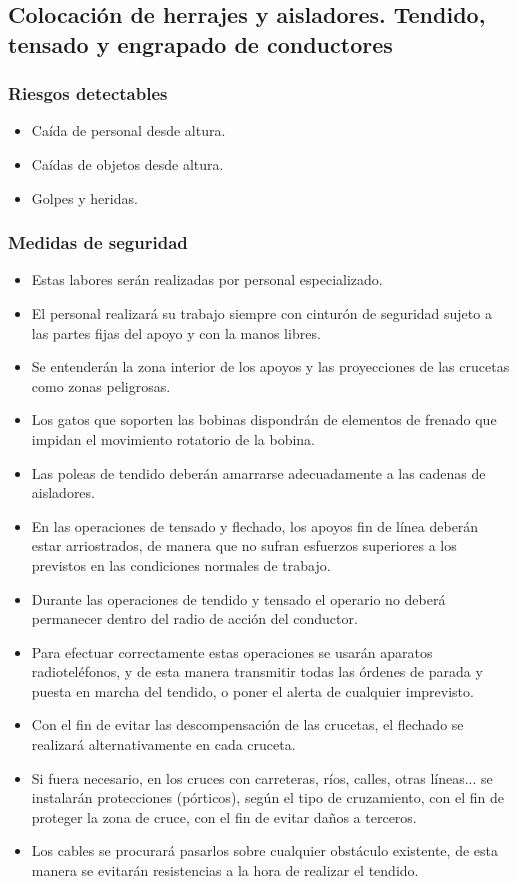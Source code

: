 \subsection{Colocación de herrajes y aisladores. Tendido, tensado y engrapado de conductores}
\label{subsec:sys-riesgosHerrajes}
\subsubsection{Riesgos detectables}
\label{subsubsec:sysHerrajes-RD}
\begin{itemize}
    \item Caída de personal desde altura.
    \item Caídas de objetos desde altura.
    \item Golpes y heridas.
\end{itemize}
\subsubsection{Medidas de seguridad}
\label{subsubsec:sysHerrajes-MS}
\begin{itemize}
    \item Estas labores serán realizadas por personal especializado.
    \item El personal realizará su trabajo siempre con cinturón de seguridad sujeto a las partes fijas del apoyo y con la manos libres.
    \item Se entenderán la zona interior de los apoyos y las proyecciones de las crucetas como zonas peligrosas.
    \item Los gatos que soporten las bobinas dispondrán de elementos de frenado que impidan el movimiento rotatorio de la bobina.
    \item Las poleas de tendido deberán amarrarse adecuadamente a las cadenas de aisladores.
    \item En las operaciones de tensado y flechado, los apoyos fin de línea deberán estar arriostrados, de manera que no sufran esfuerzos superiores a los previstos en las condiciones normales de trabajo.
    \item Durante las operaciones de tendido y tensado el operario no deberá permanecer dentro del radio de acción del conductor.
    \item Para efectuar correctamente estas operaciones se usarán aparatos radioteléfonos, y de esta manera transmitir todas las órdenes de parada y puesta en marcha del tendido, o poner el alerta de cualquier imprevisto.
    \item Con el fin de evitar las descompensación de las crucetas, el flechado se realizará alternativamente en cada cruceta.
    \item Si fuera necesario, en los cruces con carreteras, ríos, calles, otras líneas... se instalarán protecciones (pórticos), según el tipo de cruzamiento, con el fin de proteger la zona de cruce, con el fin de evitar daños a terceros.
    \item Los cables se procurará pasarlos sobre cualquier obstáculo existente, de esta manera se evitarán resistencias a la hora de realizar el tendido.
\end{itemize}
